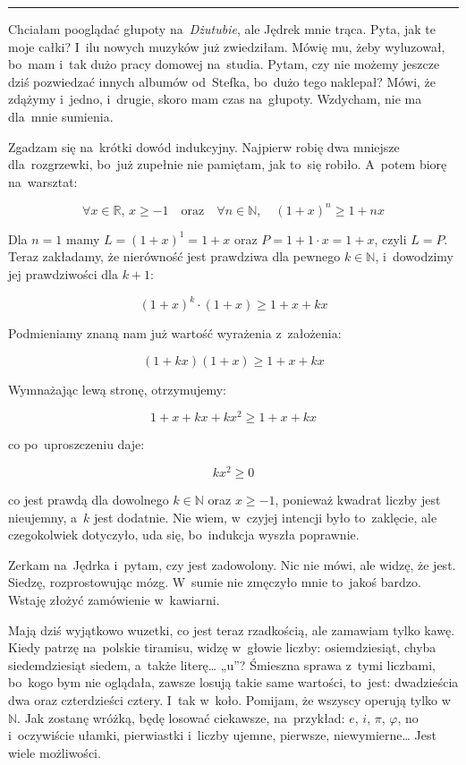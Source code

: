 \documentclass[9pt, a5paper]{memoir}
\begin{document}
\fancybreak{* \quad * \quad *}

Chciałam pooglądać głupoty na~\textit{Dżutubie}, ale Jędrek mnie trąca. Pyta, jak te moje całki? I~ilu nowych muzyków już zwiedziłam. Mówię mu, żeby wyluzował, bo~mam i~tak dużo pracy domowej na~studia. Pytam, czy nie możemy jeszcze dziś pozwiedzać innych albumów od~Stefka, bo~dużo tego naklepał? Mówi, że zdążymy i~jedno, i~drugie, skoro mam czas na~głupoty. Wzdycham, nie ma dla~mnie sumienia.

Zgadzam się na~krótki dowód indukcyjny. Najpierw robię dwa mniejsze dla~rozgrzewki, bo~już zupełnie nie pamiętam, jak to~się robiło. A~potem biorę na~warsztat:

$$\forall x \in \mathbb{R}, \, x \ge -1 \quad \text{oraz} \quad \forall n \in \mathbb{N}, \quad (1+x)^n \ge 1 + nx$$

Dla $n = 1$ mamy $L = (1+x)^1 = 1+x$ oraz $P = 1 + 1\cdot x = 1+x$, czyli $L = P$. Teraz zakładamy, że nierówność jest prawdziwa dla pewnego $k \in \mathbb{N}$, i~dowodzimy jej prawdziwości dla $k+1$:

$$(1+x)^k \cdot (1+x) \ge 1 + x + kx$$

Podmieniamy znaną nam już wartość wyrażenia z~założenia:

$$(1+kx)(1+x) \ge 1 + x + kx$$

Wymnażając lewą stronę, otrzymujemy:

$$1 + x + kx + kx^2 \ge 1 + x + kx$$

co po~uproszczeniu daje:

$$kx^2 \ge 0$$

co jest prawdą dla dowolnego $k \in \mathbb{N}$ oraz $x \ge -1$, ponieważ kwadrat liczby jest nieujemny, a~$k$ jest dodatnie. Nie wiem, w~czyjej intencji było to~zaklęcie, ale czegokolwiek dotyczyło, uda się, bo~indukcja wyszła poprawnie.

Zerkam na~Jędrka i~pytam, czy jest zadowolony. Nic nie mówi, ale widzę, że jest. Siedzę, rozprostowując mózg. W~sumie nie zmęczyło mnie to~jakoś bardzo. Wstaję złożyć zamówienie w~kawiarni.

Mają dziś wyjątkowo wuzetki, co jest teraz rzadkością, ale zamawiam tylko kawę. Kiedy patrzę na~polskie tiramisu, widzę w~głowie liczby: osiemdziesiąt, chyba siedemdziesiąt siedem, a~także literę\dots{} „u”? Śmieszna sprawa z~tymi liczbami, bo~kogo bym nie oglądała, zawsze losują takie same wartości, to~jest: dwadzieścia dwa oraz czterdzieści cztery. I~tak w~koło. Pomijam, że wszyscy operują tylko w~$\mathbb{N}$. Jak zostanę wróżką, będę losować ciekawsze, na~przykład: $e$, $i$, $\pi$, $\varphi$, no i~oczywiście ułamki, pierwiastki i~liczby ujemne, pierwsze, niewymierne\dots{} Jest wiele możliwości.
\end{document}

